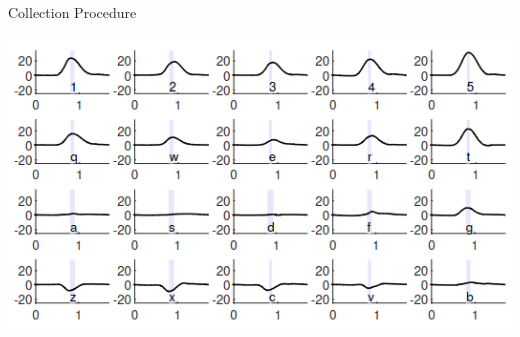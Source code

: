 \documentclass[ucs,9pt]{beamer}
\begin{document}
\begin{frame}{Collection Procedure}
\begin{minipage}[c]{0.49\linewidth}
\end{minipage}
\begin{minipage}[c]{0.49\linewidth}
	\includegraphics[width=\textwidth]{imgs/mobicom}
\end{minipage}


\end{frame}
\end{document}
